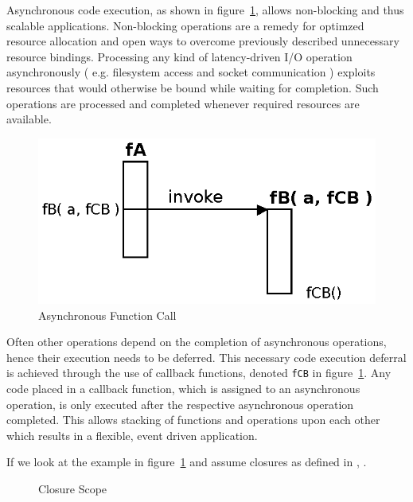 Asynchronous code execution, as shown in figure~\ref{fig:Closures_Asynchronous}, allows non-blocking and thus scalable applications.
Non-blocking operations are a remedy for optimzed resource allocation and open ways to overcome previously described unnecessary resource bindings.
Processing any kind of latency-driven I/O operation asynchronously ( e.g. filesystem access and socket communication ) exploits resources that would otherwise be bound while waiting for completion.
Such operations are processed and completed whenever required resources are available.
\begin{figure}[h!]
\centering
  \includegraphics{figures/Closures_Asynchronous}
\caption{Asynchronous Function Call}
\label{fig:Closures_Asynchronous}
\end{figure}


Often other operations depend on the completion of asynchronous operations, hence their execution needs to be deferred.
This necessary code execution deferral is achieved through the use of callback functions, denoted \texttt{fCB} in figure~\ref{fig:Closures_Asynchronous}.
Any code placed in a callback function, which is assigned to an asynchronous operation, is only executed after the respective asynchronous operation completed.
This allows stacking of functions and operations upon each other which results in a flexible, event driven application.


If we look at the example in figure~\ref{fig:Closures_Asynchronous} and assume closures as defined in \cite{EcmaScript}, .
 


\begin{figure}[htb]
\centering
\caption{Closure Scope}
\end{figure}


